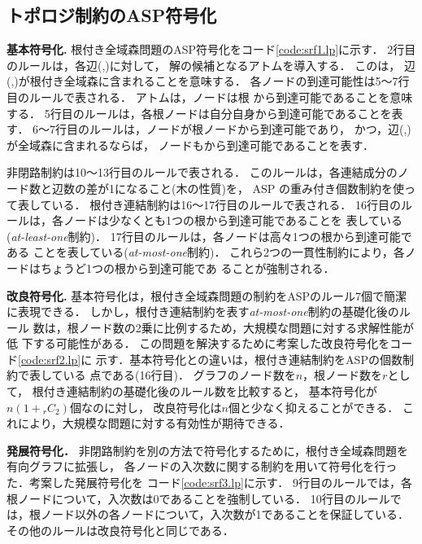 \subsection{トポロジ制約のASP符号化}
\textbf{基本符号化.}
根付き全域森問題のASP符号化をコード\ref{code:srf1.lp}に示す．
2行目のルールは，各辺(,)に対して，
解の候補となるアトムを導入する．
このは，
辺(,)が根付き全域森に含まれることを意味する．
%
各ノードの到達可能性は5～7行目のルールで表される．
アトムは，ノードは根
から到達可能であることを意味する．
5行目のルールは，各根ノードは自分自身から到達可能であることを表す．
6～7行目のルールは，ノードが根ノードから到達可能であり，
かつ，辺(,)が全域森に含まれるならば，
ノードもから到達可能であることを表す．

非閉路制約は10～13行目のルールで表される．
このルールは，各連結成分のノード数と辺数の差が1になること(木の性質)を，
ASP の重み付き個数制約を使って表している．
%
根付き連結制約は16～17行目のルールで表される．
16行目のルールは，各ノードは少なくとも1つの根から到達可能であることを
表している(\textit{at-least-one}制約)．
17行目のルールは，各ノードは高々1つの根から到達可能である
ことを表している(\textit{at-most-one}制約)．
これら2つの一貫性制約により，各ノードはちょうど1つの根から到達可能であ
ることが強制される．

\textbf{改良符号化.}
基本符号化は，根付き全域森問題の制約をASPのルール7個で簡潔に表現できる．
しかし，根付き連結制約を表す\textit{at-most-one}制約の基礎化後のルール
数は，根ノード数の2乗に比例するため，大規模な問題に対する求解性能が低
下する可能性がある．
%
この問題を解決するために考案した改良符号化をコード\ref{code:srf2.lp}に
示す．基本符号化との違いは，根付き連結制約をASPの個数制約で表している
点である(16行目)．
グラフのノード数を$n$，根ノード数を$r$として，
根付き連結制約の基礎化後のルール数を比較すると，
基本符号化が$n(1+{}_{r}C_{2})$個なのに対し，
改良符号化は$n$個と少なく抑えることができる．
これにより，大規模な問題に対する有効性が期待できる．
 
\textbf{発展符号化．}
非閉路制約を別の方法で符号化するために，根付き全域森問題を有向グラフに拡張し，
各ノードの入次数に関する制約を用いて符号化を行った．考案した発展符号化を
コード\ref{code:srf3.lp}に示す．
9行目のルールでは，各根ノードについて，入次数は0であることを強制している．
10行目のルールでは，根ノード以外の各ノードについて，入次数が1であることを保証している．
その他のルールは改良符号化と同じである．

